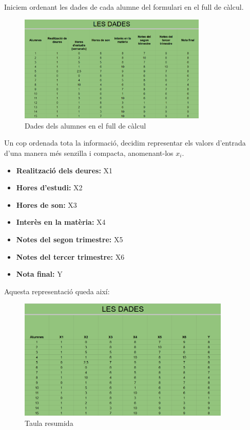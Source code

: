 Iniciem ordenant les dades de cada alumne del formulari en el full de càlcul.
\begin{figure}[H]
    \centering
    \includegraphics[width=0.8\textwidth]{./figures/Dades.png}
    \caption{Dades dels alumnes en el full de càlcul}
\end{figure}
Un cop ordenada tota la informació, decidim representar els valors d’entrada d’una manera més senzilla i compacta, anomenant-los $x_i$.
\clearpage
\begin{itemize}
 \item \textbf {Realització dels deures:} X1
 \item \textbf {Hores d'estudi:} X2
 \item \textbf {Hores de son:} X3
 \item \textbf {Interès en la matèria:} X4
 \item \textbf {Notes del segon trimestre:} X5
 \item \textbf {Notes del tercer trimestre:} X6
 \item \textbf {Nota final:} Y
\end{itemize}

Aquesta representació queda així:

\begin{figure}[h!]
    \centering
    \includegraphics[width=0.9\textwidth]{./figures/Dades_resumides.png}
    \caption{Taula resumida}
\end{figure}

